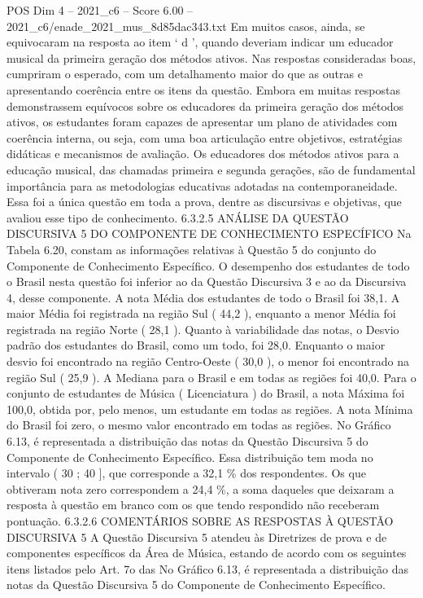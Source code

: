 \begin{textsample}{POS Dim 4 – 2021\_c6 – Score 6.00 – 2021\_c6/enade\_2021\_mus\_8d85dac343.txt}
Em muitos casos, ainda, se equivocaram na resposta ao item ‘ d ’, quando deveriam indicar um educador musical da primeira geração dos métodos ativos.
Nas respostas consideradas boas, cumpriram o esperado, com um detalhamento maior do que as outras e apresentando coerência entre os itens da questão.
Embora em muitas respostas demonstrassem equívocos sobre os educadores da primeira geração dos métodos ativos, os estudantes foram capazes de apresentar um plano de atividades com coerência interna, ou seja, com uma boa articulação entre objetivos, estratégias didáticas e mecanismos de avaliação.
Os educadores dos métodos ativos para a educação musical, das chamadas primeira e segunda gerações, são de fundamental importância para as metodologias educativas adotadas na contemporaneidade.
Essa foi a única questão em toda a prova, dentre as discursivas e objetivas, que avaliou esse tipo de conhecimento. 6.3.2.5 ANÁLISE DA QUESTÃO DISCURSIVA 5 DO COMPONENTE DE CONHECIMENTO ESPECÍFICO Na Tabela 6.20, constam as informações relativas à Questão 5 do conjunto do Componente de Conhecimento Específico.
O desempenho dos estudantes de todo o Brasil nesta questão foi inferior ao da Questão Discursiva 3 e ao da Discursiva 4, desse componente.
A nota Média dos estudantes de todo o Brasil foi 38,1.
A maior Média foi registrada na região Sul ( 44,2 ), enquanto a menor Média foi registrada na região Norte ( 28,1 ).
Quanto à variabilidade das notas, o Desvio padrão dos estudantes do Brasil, como um todo, foi 28,0.
Enquanto o maior desvio foi encontrado na região Centro-Oeste ( 30,0 ), o menor foi encontrado na região Sul ( 25,9 ).
A Mediana para o Brasil e em todas as regiões foi 40,0.
Para o conjunto de estudantes de Música ( Licenciatura ) do Brasil, a nota Máxima foi 100,0, obtida por, pelo menos, um estudante em todas as regiões.
A nota Mínima do Brasil foi zero, o mesmo valor encontrado em todas as regiões.
No Gráfico 6.13, é representada a distribuição das notas da Questão Discursiva 5 do Componente de Conhecimento Específico.
Essa distribuição tem moda no intervalo ( 30 ; 40 ], que corresponde a 32,1 \% dos respondentes.
Os que obtiveram nota zero correspondem a 24,4 \%, a soma daqueles que deixaram a resposta à questão em branco com os que tendo respondido não receberam pontuação. 6.3.2.6 COMENTÁRIOS SOBRE AS RESPOSTAS À QUESTÃO DISCURSIVA 5 A Questão Discursiva 5 atendeu às Diretrizes de prova e de componentes específicos da Área de Música, estando de acordo com os seguintes itens listados pelo Art. 7o das No Gráfico 6.13, é representada a distribuição das notas da Questão Discursiva 5 do Componente de Conhecimento Específico.

\end{textsample}
